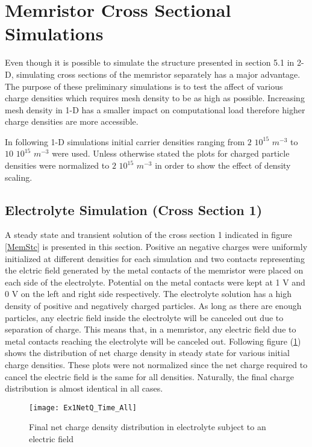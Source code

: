 \clearpage
\section{Memristor Cross Sectional Simulations}

Even though it is possible to simulate the structure presented in section 5.1 in 2-D, simulating cross sections of the memristor separately has a major advantage. The purpose of these preliminary  simulations is to test the affect of various charge densities which requires mesh density to be as high as possible. Increasing mesh density in 1-D has a smaller impact on computational load therefore higher charge densities are more accessible.  

In following 1-D simulations initial carrier densities ranging from $2$ $10^{15}$ $m^{-3}$ to $10$ $10^{15}$ $m^{-3}$ were used. Unless otherwise stated the plots for charged particle densities were normalized to $2$ $10^{15}$ $m^{-3}$ in order to show the effect of density scaling. 

\subsection{Electrolyte Simulation (Cross Section 1)}

A steady state and transient solution of the cross section 1 indicated in figure \ref{MemStc} is presented in this section. Positive an negative charges were uniformly initialized at different densities for each simulation and two contacts representing the elctric field generated by the metal contacts of the memristor were placed on each side of the electrolyte. Potential on the metal contacts were kept at 1 V and 0 V on the left and right side respectively. The electrolyte solution has a high density of positive and negatively charged particles. As long as there are enough particles, any electric field inside the electrolyte will be canceled out due to separation of charge. This means that, in a memristor, any electric field due to metal contacts reaching the electrolyte will be canceled out. Following figure (\ref{ElectrolyteQ}) shows the distribution of net charge density in steady state for various initial charge densities.  These plots were not normalized since the net charge required to cancel the electric field is the same for all densities. Naturally, the final charge distribution is almost identical in all cases.

\begin{figure}[htp]
\centering
\texttt{[image: Ex1NetQ\_Time\_All]}
\caption{Final net charge density distribution in electrolyte subject to an electric field} 
\label{ElectrolyteQ}
\end{figure}

